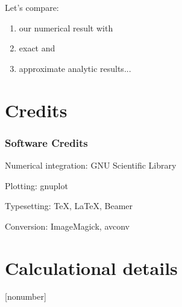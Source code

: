 \documentclass[aspectratio=169]{beamer}
\begin{document}
\begin{frame}
Let's \alert{compare}:

\begin{enumerate}
\pause
\item our \alert<2>{numerical} result with
\pause
\item \alert<3>{exact} and
\pause
\item \alert<4>{approximate} analytic results...
\end{enumerate}
\end{frame}




\section{Credits}

\begin{frame}
\frametitle{Software Credits}

Numerical integration: GNU Scientific Library

Plotting: gnuplot

Typesetting: \TeX, \LaTeX, Beamer

Conversion: ImageMagick, avconv
\end{frame}


\section{Calculational details}

\begin{frame}
[nonumber]
\sectionpage
\end{frame}
\end{document}
